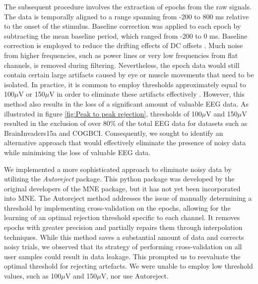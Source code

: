 
The subsequent procedure involves the extraction of epochs from the raw signals. The data is temporally aligned to a range spanning from -200 to 800 ms relative to the onset of the stimulus. Baseline correction was applied to each epoch by 
subtracting the mean baseline period, which ranged from -200 to 0 ms. Baseline correction is employed to reduce the drifting effects of DC offsets \cite{fallahi2023brainnet}. Much noise from higher frequencies, such as power lines or very low frequencies from flat channels, is removed during filtering. Nevertheless, the epoch data would still contain certain large artifacts caused by eye or muscle movements that need to be isolated. In practice, it is common to employ thresholds approximately equal to 100$\mu$V or 150$\mu$V in order to eliminate these artifacts effectively \cite{survey_brain_biometrics}. However, this method also results in the loss of a significant amount of valuable EEG data. As illustrated in figure \ref{fig:Peak to peak rejection}, thresholds of 100$\mu$V and 150$\mu$V resulted in the exclusion of over 80$\%$ of the total EEG data for datasets such as BrainInvaders15a and COGBCI. Consequently, we sought to identify an alternative approach that would effectively eliminate the presence of noisy data while minimising the loss of valuable EEG data.
\smallskip

We implemented a more sophisticated approach to eliminate noisy data by utilizing the \textit{Autoreject} \cite{jas2016automated} package. This python package was developed by the original developers of the MNE package, but it has not yet been incorporated into MNE. The Autoreject method addresses the issue of manually determining a threshold by implementing cross-validation on the epochs, allowing for the learning of an optimal rejection threshold specific to each channel. It removes epochs with greater precision and partially repairs them through interpolation techniques. While this method saves a substantial amount of data and corrects noisy trials, we observed that its strategy of performing cross-validation on all user samples could result in data leakage. This prompted us to reevaluate the optimal threshold for rejecting artefacts. We were unable to employ low threshold values, such as 100$\mu$V and 150$\mu$V, nor use Autoreject.
\smallskip

